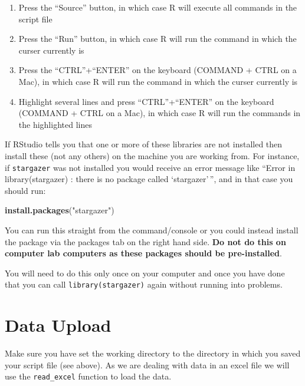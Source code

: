 \documentclass[
]{article}
\newenvironment{Shaded}{\begin{snugshade}}{\end{snugshade}}
\newcommand{\FunctionTok}[1]{\textcolor[rgb]{0.13,0.29,0.53}{\textbf{#1}}}
\newcommand{\NormalTok}[1]{#1}
\newcommand{\StringTok}[1]{\textcolor[rgb]{0.31,0.60,0.02}{#1}}
\providecommand{\tightlist}{%
  \setlength{\itemsep}{0pt}\setlength{\parskip}{0pt}}
\begin{document}
\begin{enumerate}
\def\labelenumi{\arabic{enumi}.}
\tightlist
\item
  Press the ``Source'' button, in which case R will execute all commands
  in the script file
\item
  Press the ``Run'' button, in which case R will run the command in
  which the curser currently is
\item
  Press the ``CTRL''+``ENTER'' on the keyboard (COMMAND + CTRL on a
  Mac), in which case R will run the command in which the curser
  currently is
\item
  Highlight several lines and press ``CTRL''+``ENTER'' on the keyboard
  (COMMAND + CTRL on a Mac), in which case R will run the commands in
  the highlighted lines
\end{enumerate}

If RStudio tells you that one or more of these libraries are not
installed then install these (not any others) on the machine you are
working from. For instance, if \texttt{stargazer} was not installed you
would receive an error message like ``Error in library(stargazer) :
there is no package called `stargazer'\,'', and in that case you should
run:

\begin{Shaded}
\begin{Highlighting}[]
\FunctionTok{install.packages}\NormalTok{(}\StringTok{"stargazer"}\NormalTok{)}
\end{Highlighting}
\end{Shaded}

You can run this straight from the command/console or you could instead
install the package via the packages tab on the right hand side.
\textbf{Do not do this on computer lab computers as these packages
should be pre-installed}.

You will need to do this only once on your computer and once you have
done that you can call \texttt{library(stargazer)} again without running
into problems.

\hypertarget{data-upload}{%
\section{Data Upload}\label{data-upload}}

Make sure you have set the working directory to the directory in which
you saved your script file (see above). As we are dealing with data in
an excel file we will use the \texttt{read\_excel} function to load the
data.
\end{document}
